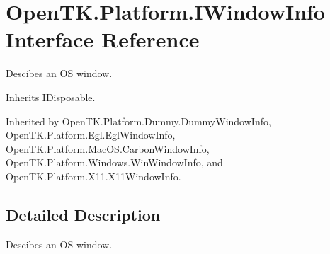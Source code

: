 \hypertarget{interface_open_t_k_1_1_platform_1_1_i_window_info}{\section{Open\-T\-K.\-Platform.\-I\-Window\-Info Interface Reference}
\label{interface_open_t_k_1_1_platform_1_1_i_window_info}
}


Descibes an O\-S window. 




Inherits I\-Disposable.



Inherited by Open\-T\-K.\-Platform.\-Dummy.\-Dummy\-Window\-Info, Open\-T\-K.\-Platform.\-Egl.\-Egl\-Window\-Info, Open\-T\-K.\-Platform.\-Mac\-O\-S.\-Carbon\-Window\-Info, Open\-T\-K.\-Platform.\-Windows.\-Win\-Window\-Info, and Open\-T\-K.\-Platform.\-X11.\-X11\-Window\-Info.



\subsection{Detailed Description}
Descibes an O\-S window.

